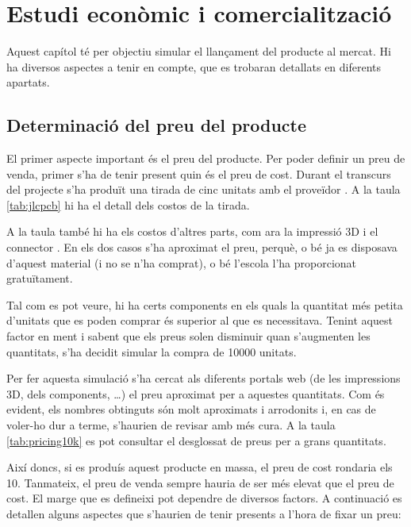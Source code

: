 \chapter{Estudi econòmic i comercialització}
\label{cap:economia}

Aquest capítol té per objectiu simular el llançament del producte al mercat.
Hi ha diversos aspectes a tenir en compte, que es trobaran detallats en
diferents apartats.

\section{Determinació del preu del producte}

El primer aspecte important és el preu del producte. Per poder definir un
preu de venda, primer s'ha de tenir present quin és el preu de cost. Durant
el transcurs del projecte s'ha produït una tirada de cinc unitats amb el
proveïdor . A la taula \ref{tab:jlcpcb} hi ha el detall dels
costos de la tirada.



A la taula també hi ha els costos d'altres parts, com ara la impressió
3D i el connector . En els dos casos s'ha aproximat el preu, perquè,
o bé ja es disposava d'aquest material (i no se n'ha comprat), o bé l'escola
l'ha proporcionat gratuïtament.

Tal com es pot veure, hi ha certs components en els quals la quantitat més petita
d'unitats que es poden comprar és superior al que es necessitava. Tenint aquest
factor en ment i sabent que els preus solen disminuir quan s'augmenten les
quantitats, s'ha decidit simular la compra de 10000 unitats.

Per fer aquesta simulació s'ha cercat als diferents portals web (de les
impressions 3D, dels components, \dots) el preu aproximat per a aquestes
quantitats. Com és evident, els nombres obtinguts són molt aproximats i
arrodonits i, en cas de voler-ho dur a terme, s'haurien de revisar amb més
cura. A la taula
\ref{tab:pricing10k} es pot consultar el desglossat de preus per a
grans quantitats.



Així doncs, si es produís aquest producte en massa, el preu de cost rondaria
els \SI[round-mode=places,round-precision=0]{10}{\EUR}.
Tanmateix, el preu de venda sempre hauria de ser més elevat que
el preu de cost. El marge que es defineixi pot dependre de diversos factors.
A continuació es detallen alguns aspectes que s'haurien de tenir presents
a l'hora de fixar un preu:

